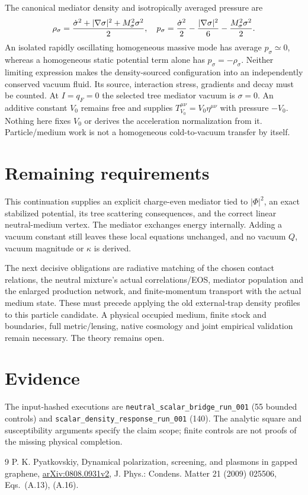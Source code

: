 \documentclass[11pt]{article}
\begin{document}
The canonical mediator density and isotropically averaged pressure are
\begin{equation}
 \rho_\sigma={\dot\sigma^2+|\nabla\sigma|^2+M_\sigma^2\sigma^2\over2},
 \quad p_\sigma={\dot\sigma^2\over2}
                -{|\nabla\sigma|^2\over6}
                -{M_\sigma^2\sigma^2\over2}.
\end{equation}
An isolated rapidly oscillating homogeneous massive mode has average
$p_\sigma\simeq0$, whereas a homogeneous static potential term alone has
$p_\sigma=-\rho_\sigma$. Neither limiting expression makes the
density-sourced configuration into an independently conserved vacuum fluid.
Its source, interaction stress, gradients and decay must be counted.
At $I=q_F=0$ the selected tree mediator vacuum is $\sigma=0$.
An additive constant $V_0$ remains free and supplies
$T_{V_0}^{\mu\nu}=V_0\eta^{\mu\nu}$ with pressure $-V_0$.
Nothing here fixes $V_0$ or derives the acceleration normalization from it.
Particle/medium work is not a homogeneous cold-to-vacuum transfer by itself.

\section{Remaining requirements}
This continuation supplies an explicit charge-even mediator tied to
$|\Phi|^2$, an exact stabilized potential, its tree scattering consequences,
and the correct linear neutral-medium vertex. The mediator exchanges energy
internally. Adding a vacuum constant still leaves these local equations
unchanged, and no vacuum $Q$, vacuum magnitude or $\kappa$ is derived.

The next decisive obligations are radiative matching of the chosen contact
relations, the neutral mixture's actual correlations/EOS, mediator population
and the enlarged production network, and finite-momentum transport with the
actual medium state. These must precede applying the old external-trap
density profiles to this particle candidate. A physical occupied medium,
finite stock and boundaries, full metric/lensing, native cosmology and joint
empirical validation remain necessary. The theory remains open.

\section{Evidence}
The input-hashed executions are
\texttt{neutral\_scalar\_bridge\_run\_001} (55 bounded controls) and
\texttt{scalar\_density\_response\_run\_001} (140).
The analytic square and susceptibility arguments specify the claim scope;
finite controls are not proofs of the missing physical completion.

\begin{thebibliography}{9}
 P. K. Pyatkovskiy,
Dynamical polarization, screening, and plasmons in gapped graphene,
\href{https://arxiv.org/pdf/0808.0931v2}{arXiv:0808.0931v2},
J. Phys.: Condens. Matter 21 (2009) 025506, Eqs.~(A.13), (A.16).
\end{thebibliography}
\end{document}
